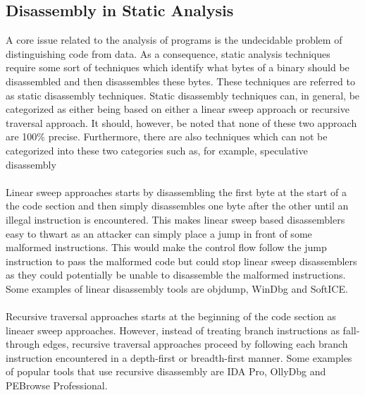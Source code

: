 \documentclass{kththesis}
\begin{document}
\subsection{Disassembly in Static Analysis}
A core issue related to the analysis of programs is the undecidable problem of distinguishing code from data\cite{ABinaryRewriting}. As a consequence, static analysis techniques require some sort of techniques which identify what bytes of a binary should be disassembled and then disassembles these bytes. These techniques are referred to as static disassembly techniques. Static disassembly techniques can, in general, be categorized as either being based on either a linear sweep approach or recursive traversal approach\cite{DisassemblyOfExecutable}. It should, however, be noted that none of these two approach are 100\% precise\cite{ABinaryRewriting}. Furthermore, there are also techniques which can not be categorized into these two categories such as, for example, speculative disassembly\cite{preciseCFG}
\\ \\
Linear sweep approaches starts by disassembling the first byte at the start of a the code section and then simply disassembles one byte after the other until an illegal instruction is encountered\cite{ABinaryRewriting}. This makes linear sweep based disassemblers easy to thwart as an attacker can simply place a jump in front of some malformed instructions. This would make the control flow follow the jump instruction to pass the malformed code but could stop linear sweep disassemblers as they could potentially be unable to disassemble the malformed instructions\cite{ABinaryRewriting}. Some examples of linear disassembly tools are objdump, WinDbg and SoftICE\cite{ReversingSecretsofReverseEngineering}.
\\ \\ 
Recursive traversal approaches starts at the beginning of the code section as lineaer sweep approaches. However, instead of treating branch instructions as fall-through edges, recursive traversal approaches proceed by following each branch instruction encountered in a depth-first or breadth-first manner. Some examples of popular tools that use recursive disassembly are IDA Pro, OllyDbg and PEBrowse Professional\cite{ReversingSecretsofReverseEngineering}.
\end{document}
